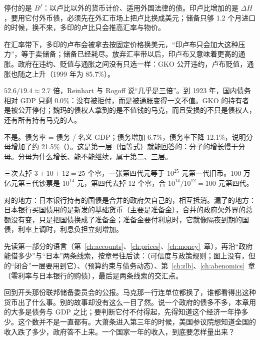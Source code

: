 \begin{answers}
\item 停付的是 $B^{f}$：以卢比以外的货币计价、适用外国法律的债\cite{lktreasury2022}。印卢比增加的是 $\Delta H$，要用它付外币债，必须先在外汇市场上把卢比换成美元；储备只够 1.2 个月进口的时候，换不来，多印的卢比只会推高汇率与物价。
\item 在汇率带下，多印的卢布会被拿去按固定价格换美元，“印卢布只会加大这种压力”\cite{chiodo2002}，等于卖储备；储备已经耗尽。放弃汇率带以后，印卢布又意味着更高的通胀。政府在违约、贬值与通胀之间没有只选一样：GKO 公开违约，卢布贬值，通胀也随之上升（1999 年为 85.7\%）。
\item $52.6/19.4\approx2.7$ 倍，Reinhart 与 Rogoff 说“几乎是三倍”\cite{reinhart2008}。到 1923 年，国内债务相对 GDP 只剩 0.0\%：没有被拒付，而是被通胀变得一文不值。GKO 的持有者是被公开停付；魏玛的债权人拿到的是不值钱的马克，而且受损的不只是债权人，还有所有持有马克的人。
\item 不是。债务率 = 债务 / 名义 GDP；债务增加 6.7\%，债务率下降 12.1\%，说明分母增加了约 21.5\%（）。这是第一层（恒等式）就能回答的：分子的增长慢于分母。分母为什么增长、能不能继续，属于第二、三层。
\item 三次去掉 $3+10+12=25$ 个零，一张第四代元等于 $10^{25}$ 元第一代旧币。100 万亿元第三代钞票是 $10^{14}$ 元，第四代去掉 12 个零，合 $10^{14}/10^{12}=100$ 元第四代。
\item 对的地方：日本银行持有的国债是合并的政府欠自己的，相互抵消。漏了的地方：日本银行买国债用的是新发的基础货币（主要是准备金），合并的政府欠外界的总额没有变，只是把国债换成了准备金；准备金要付利息时，它就像隔夜到期的国债，利率上调时，利息负担立刻增加。
\item 先读第一部分的语言（第~\ref{ch:accounts}、\ref{ch:prices}、\ref{ch:money}~章），再沿“政府能借多少”与“日本”两条线索，按章号往后读：（可信度与政策规则；图上没有，但的“闭合”一层要用到它）、（预算约束与债务动态）、第~\ref{ch:zlb}、\ref{ch:abenomics}~章（零利率与日本银行的购债），最后是两条线索的交汇点。
\end{answers}

回到开头那份联邦储备委员会的公报。马克那一行连单位都换了，谁都看得出这种货币出了什么事。别的故事却没有这么一目了然。说一个政府的债多不多，本章用的大多是债务与 GDP 之比；要判断它付不付得起，先得知道这个经济一年挣多少。这个数并不是一直都有。大萧条进入第三年的时候，美国参议院想知道全国的收入跌了多少，政府答不上来\cite{kuznets1934}。一个国家一年的收入，到底要怎样量出来？
